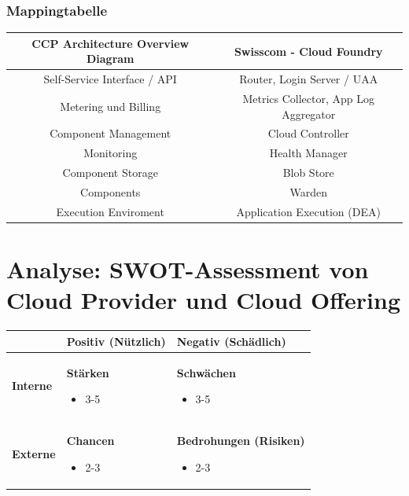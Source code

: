 \subsection{Mappingtabelle}
\begin{table}[H]
\begin{tabular}{|c|c|}
\hline 
\textbf{CCP Architecture Overview Diagram} & \textbf{Swisscom - Cloud Foundry} \\ 
\hline 
Self-Service Interface / API & Router, Login Server / UAA \\ 
\hline 
Metering und Billing & Metrics Collector, App Log Aggregator \\ 
\hline 
Component Management & Cloud Controller \\ 
\hline 
Monitoring & Health Manager \\ 
\hline 
Component Storage & Blob Store \\ 
\hline 
Components & Warden \\ 
\hline 
Execution Enviroment & Application Execution (DEA) \\ 
\hline 
\end{tabular} 
\end{table}

\chapter{Analyse: SWOT-Assessment von Cloud Provider und Cloud Offering}
\begin{table}[H]
\begin{tabular}{|l|p{}|p{}|}
\hline 
 & \textbf{Positiv (Nützlich)}  & \textbf{Negativ (Schädlich)} \\ \hline 
\textbf{Interne} & \textbf{Stärken} 
\begin{itemize}
\item 3-5
\end{itemize}

& \textbf{Schwächen}
\begin{itemize}
\item 3-5
\end{itemize}

\\ \hline 
\textbf{Externe} & \textbf{Chancen} 
\begin{itemize}
\item 2-3
\end{itemize}&
\textbf{Bedrohungen (Risiken)} 
 \begin{itemize}
\item 2-3
\end{itemize}
\\ \hline 
\end{tabular} 
\end{table}

